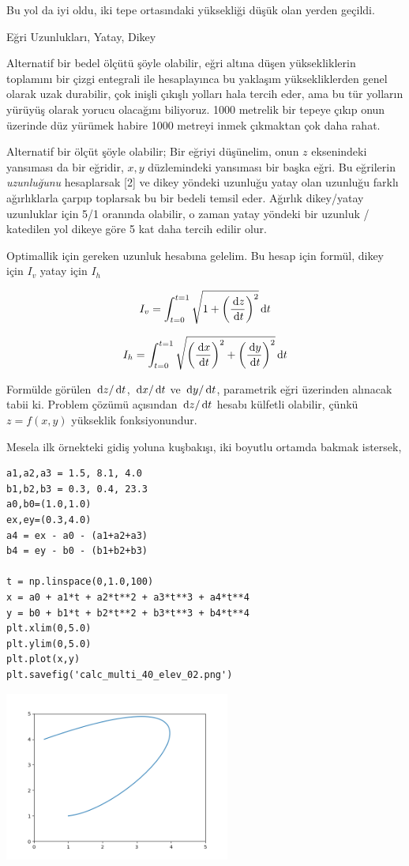 \documentclass[12pt,fleqn]{article}\usepackage{../../common}
\begin{document}
Bu yol da iyi oldu, iki tepe ortasındaki yüksekliği düşük olan yerden
geçildi. 

Eğri Uzunlukları, Yatay, Dikey

Alternatif bir bedel ölçütü şöyle olabilir, eğri altına düşen yüksekliklerin
toplamını bir çizgi entegrali ile hesaplayınca bu yaklaşım yüksekliklerden genel
olarak uzak durabilir, çok inişli çıkışlı yolları hala tercih eder, ama bu tür
yolların yürüyüş olarak yorucu olacağını biliyoruz. 1000 metrelik bir tepeye
çıkıp onun üzerinde düz yürümek habire 1000 metreyi inmek çıkmaktan çok daha
rahat.

Alternatif bir ölçüt şöyle olabilir; Bir eğriyi düşünelim, onun $z$ eksenindeki
yansıması da bir eğridir, $x,y$ düzlemindeki yansıması bir başka eğri. Bu
eğrilerin {\em uzunluğunu} hesaplarsak [2] ve dikey yöndeki uzunluğu yatay olan
uzunluğu farklı ağırlıklarla çarpıp toplarsak bu bir bedeli temsil eder. Ağırlık
dikey/yatay uzunluklar için 5/1 oranında olabilir, o zaman yatay yöndeki bir
uzunluk / katedilen yol dikeye göre 5 kat daha tercih edilir olur.

Optimallik için gereken uzunluk hesabına gelelim. Bu hesap için
formül, dikey için $I_v$ yatay için $I_h$

$$
I_v = \int_{t=0}^{t=1} \sqrt{1 + \left(\frac{\,\mathrm{d} z}{\,\mathrm{d} t} \right)^2 } \,\mathrm{d} t
$$

$$
I_h = \int_{t=0}^{t=1} \sqrt{
\left(\frac{\,\mathrm{d} x}{\,\mathrm{d} t} \right)^2 + 
\left(\frac{\,\mathrm{d} y}{\,\mathrm{d} t} \right)^2
} 
\,\mathrm{d} t
$$

Formülde görülen $\,\mathrm{d} z/\,\mathrm{d} t$, $\,\mathrm{d} x/\,\mathrm{d} t$ ve $\,\mathrm{d} y/\,\mathrm{d} t$, parametrik eğri
üzerinden alınacak tabii ki. Problem çözümü açısından $\,\mathrm{d} z/\,\mathrm{d} t$ hesabı
külfetli olabilir, çünkü $z = f(x,y)$ yükseklik fonksiyonundur.

Mesela ilk örnekteki gidiş yoluna kuşbakışı, iki boyutlu ortamda bakmak
istersek,

\begin{verbatim}
a1,a2,a3 = 1.5, 8.1, 4.0
b1,b2,b3 = 0.3, 0.4, 23.3
a0,b0=(1.0,1.0)
ex,ey=(0.3,4.0)
a4 = ex - a0 - (a1+a2+a3)
b4 = ey - b0 - (b1+b2+b3)
  
t = np.linspace(0,1.0,100)
x = a0 + a1*t + a2*t**2 + a3*t**3 + a4*t**4 
y = b0 + b1*t + b2*t**2 + b3*t**3 + b4*t**4
plt.xlim(0,5.0)
plt.ylim(0,5.0)
plt.plot(x,y)
plt.savefig('calc_multi_40_elev_02.png')
\end{verbatim}

\includegraphics[width=20em]{calc_multi_40_elev_02.png}
\end{document}
